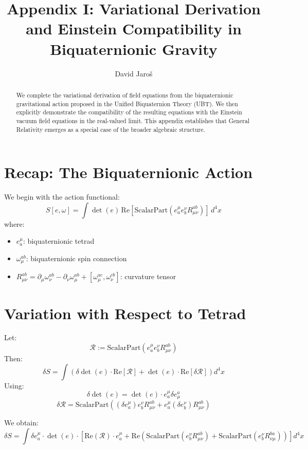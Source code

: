 \documentclass[11pt]{article}
\title{\textbf{Appendix I: Variational Derivation and Einstein Compatibility in Biquaternionic Gravity}}
\author{David Jaroš}
\affil{Independent Researcher}
\date{}
\begin{document}
\maketitle

\begin{abstract}
We complete the variational derivation of field equations from the biquaternionic gravitational action proposed in the Unified Biquaternion Theory (UBT). We then explicitly demonstrate the compatibility of the resulting equations with the Einstein vacuum field equations in the real-valued limit. This appendix establishes that General Relativity emerges as a special case of the broader algebraic structure.
\end{abstract}

\section{Recap: The Biquaternionic Action}
We begin with the action functional:
\[
S[e,\omega] = \int \det(e) \, \text{Re}\left[\text{ScalarPart}(e^\mu_a e^\nu_b R_{\mu\nu}^{ab})\right] \, d^4x
\]
where:
\begin{itemize}
  \item \( e^\mu_a \): biquaternionic tetrad
  \item \( \omega_\mu^{ab} \): biquaternionic spin connection
  \item \( R_{\mu\nu}^{ab} = \partial_\mu \omega_\nu^{ab} - \partial_\nu \omega_\mu^{ab} + [\omega_\mu^{ac}, \omega_\nu^{cb}] \): curvature tensor
\end{itemize}

\section{Variation with Respect to Tetrad}

Let:
\[
\mathcal{R} := \text{ScalarPart}(e^\mu_a e^\nu_b R_{\mu\nu}^{ab})
\]
Then:
\[
\delta S = \int \left( \delta \det(e) \cdot \text{Re}[\mathcal{R}] + \det(e) \cdot \text{Re}[\delta \mathcal{R}] \right) d^4x
\]
Using:
\[
\delta \det(e) = \det(e) \cdot e^\mu_a \delta e^a_\mu
\]
\[
\delta \mathcal{R} = \text{ScalarPart}\left( (\delta e^\mu_a) e^\nu_b R_{\mu\nu}^{ab} + e^\mu_a (\delta e^\nu_b) R_{\mu\nu}^{ab} \right)
\]

We obtain:
\[
\delta S = \int \delta e^\mu_a \cdot \det(e) \cdot \left[ \text{Re}(\mathcal{R}) \cdot e^\mu_a + \text{Re}\left( \text{ScalarPart}(e^\nu_b R_{\mu\nu}^{ab}) + \text{ScalarPart}(e^\nu_b R_{\nu\mu}^{ba}) \right) \right] d^4x
\]
\end{document}
